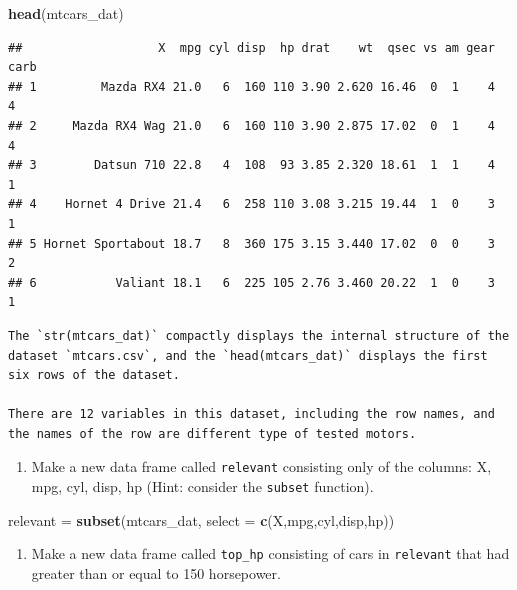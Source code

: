 \documentclass[
]{article}
\newenvironment{Shaded}{\begin{snugshade}}{\end{snugshade}}
\newcommand{\DataTypeTok}[1]{\textcolor[rgb]{0.13,0.29,0.53}{#1}}
\newcommand{\KeywordTok}[1]{\textcolor[rgb]{0.13,0.29,0.53}{\textbf{#1}}}
\newcommand{\NormalTok}[1]{#1}
\newcommand{\StringTok}[1]{\textcolor[rgb]{0.31,0.60,0.02}{#1}}
\providecommand{\tightlist}{%
  \setlength{\itemsep}{0pt}\setlength{\parskip}{0pt}}
\begin{document}
\begin{Shaded}
\begin{Highlighting}[]
\KeywordTok{head}\NormalTok{(mtcars_dat)}
\end{Highlighting}
\end{Shaded}

\begin{verbatim}
##                   X  mpg cyl disp  hp drat    wt  qsec vs am gear carb
## 1         Mazda RX4 21.0   6  160 110 3.90 2.620 16.46  0  1    4    4
## 2     Mazda RX4 Wag 21.0   6  160 110 3.90 2.875 17.02  0  1    4    4
## 3        Datsun 710 22.8   4  108  93 3.85 2.320 18.61  1  1    4    1
## 4    Hornet 4 Drive 21.4   6  258 110 3.08 3.215 19.44  1  0    3    1
## 5 Hornet Sportabout 18.7   8  360 175 3.15 3.440 17.02  0  0    3    2
## 6           Valiant 18.1   6  225 105 2.76 3.460 20.22  1  0    3    1
\end{verbatim}

\begin{verbatim}
The `str(mtcars_dat)` compactly displays the internal structure of the dataset `mtcars.csv`, and the `head(mtcars_dat)` displays the first six rows of the dataset.

There are 12 variables in this dataset, including the row names, and the names of the row are different type of tested motors.
\end{verbatim}

\begin{enumerate}
\def\labelenumi{\arabic{enumi}.}
\setcounter{enumi}{1}
\tightlist
\item
  Make a new data frame called \texttt{relevant} consisting only of the
  columns: X, mpg, cyl, disp, hp (Hint: consider the \texttt{subset}
  function).
\end{enumerate}

\begin{Shaded}
\begin{Highlighting}[]
\NormalTok{relevant =}\StringTok{ }\KeywordTok{subset}\NormalTok{(mtcars_dat, }\DataTypeTok{select =} \KeywordTok{c}\NormalTok{(X,mpg,cyl,disp,hp))}
\end{Highlighting}
\end{Shaded}

\begin{enumerate}
\def\labelenumi{\arabic{enumi}.}
\setcounter{enumi}{2}
\tightlist
\item
  Make a new data frame called \texttt{top\_hp} consisting of cars in
  \texttt{relevant} that had greater than or equal to 150 horsepower.
\end{enumerate}
\end{document}
